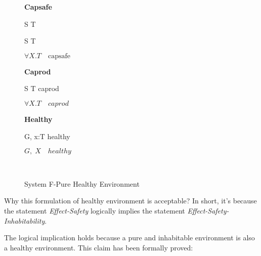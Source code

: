 \begin{figure}[h]
\begin{framed}

\setlength{\columnseprule}{0.4pt}
\begin{multicols}{2}

\textbf{Capsafe}


{ S \to T \quad {} }

{ S \to T \quad {} }

{ \colorbox{shade}{$\forall X.T \quad \text{capsafe}$} }

\columnbreak

\textbf{Caprod}


{ S \to T \quad caprod }

{ \colorbox{shade}{$\forall X.T \quad caprod$} }

\textbf{Healthy}


{ G, \; x:T \quad healthy }

{ \colorbox{shade}{$G, \; X \quad healthy$} }

\hfill\\

\end{multicols}
\end{framed}

\caption{System F-Pure Healthy Environment}
\label{fig:f-pure-healthy-definition}
\end{figure}

Why this formulation of healthy environment is acceptable? In short,
it's because the statement \emph{Effect-Safety} logically implies the
statement \emph{Effect-Safety-Inhabitability}.

The logical implication holds because a pure and inhabitable
environment is also a healthy environment. This claim has been
formally proved:


